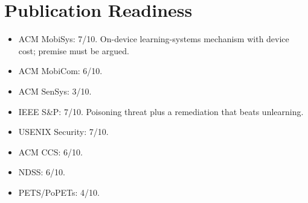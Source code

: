 \documentclass[11pt]{article}
\begin{document}
\section{Publication Readiness}
\begin{itemize}
  \item ACM MobiSys: 7/10. On-device learning-systems mechanism with device cost; premise must be argued.
  \item ACM MobiCom: 6/10.
  \item ACM SenSys: 3/10.
  \item IEEE S\&P: 7/10. Poisoning threat plus a remediation that beats unlearning.
  \item USENIX Security: 7/10.
  \item ACM CCS: 6/10.
  \item NDSS: 6/10.
  \item PETS/PoPETs: 4/10.
\end{itemize}
\end{document}
